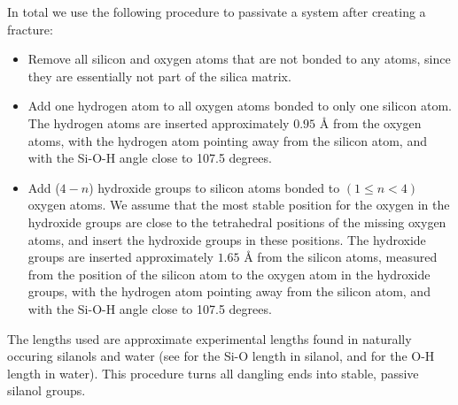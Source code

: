 In total we use the following procedure to passivate a system after creating a fracture:
\begin{itemize}
    \item Remove all silicon and oxygen atoms that are not bonded to any atoms, since they are essentially not part of the silica matrix.
    \item Add one hydrogen atom to all oxygen atoms bonded to only one silicon atom. The hydrogen atoms are inserted approximately $0.95\text{ \AA}$ from the oxygen atoms, with the hydrogen atom pointing away from the silicon atom, and with the Si-O-H angle close to 107.5 degrees.
    \item Add ($4-n$) hydroxide groups to silicon atoms bonded to $(1\leq n<4)$ oxygen atoms. We assume that the most stable position for the oxygen in the hydroxide groups are close to the tetrahedral positions of the missing oxygen atoms, and insert the hydroxide groups in these positions. %
    The hydroxide groups are inserted approximately $1.65\text{ \AA}$ from the silicon atoms, measured from the position of the silicon atom to the oxygen atom in the hydroxide groups, with the hydrogen atom pointing away from the silicon atom, and with the Si-O-H angle close to 107.5 degrees.
\end{itemize}
The lengths used are approximate experimental lengths found in naturally occuring silanols and water (see \cite{lickiss1995synthesis} for the Si-O length in silanol, and \cite{csaszar2005equilibrium} for the O-H length in water). This procedure turns all dangling ends into stable, passive silanol groups.
%

